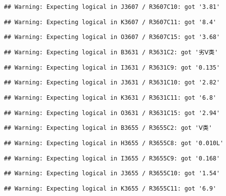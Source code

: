 \documentclass[
]{article}
\begin{document}
\begin{verbatim}
## Warning: Expecting logical in J3607 / R3607C10: got '3.81'
\end{verbatim}

\begin{verbatim}
## Warning: Expecting logical in K3607 / R3607C11: got '8.4'
\end{verbatim}

\begin{verbatim}
## Warning: Expecting logical in O3607 / R3607C15: got '3.68'
\end{verbatim}

\begin{verbatim}
## Warning: Expecting logical in B3631 / R3631C2: got '劣Ⅴ类'
\end{verbatim}

\begin{verbatim}
## Warning: Expecting logical in I3631 / R3631C9: got '0.135'
\end{verbatim}

\begin{verbatim}
## Warning: Expecting logical in J3631 / R3631C10: got '2.82'
\end{verbatim}

\begin{verbatim}
## Warning: Expecting logical in K3631 / R3631C11: got '6.8'
\end{verbatim}

\begin{verbatim}
## Warning: Expecting logical in O3631 / R3631C15: got '2.94'
\end{verbatim}

\begin{verbatim}
## Warning: Expecting logical in B3655 / R3655C2: got 'Ⅴ类'
\end{verbatim}

\begin{verbatim}
## Warning: Expecting logical in H3655 / R3655C8: got '0.010L'
\end{verbatim}

\begin{verbatim}
## Warning: Expecting logical in I3655 / R3655C9: got '0.168'
\end{verbatim}

\begin{verbatim}
## Warning: Expecting logical in J3655 / R3655C10: got '1.54'
\end{verbatim}

\begin{verbatim}
## Warning: Expecting logical in K3655 / R3655C11: got '6.9'
\end{verbatim}
\end{document}
